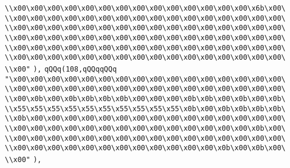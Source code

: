 \verb|\\x00\x00\x00\x00\x00\x00\x00\x00\x00\x00\x00\x00\x00\x00\x6b\x00\|\newline
\verb|\\x00\x00\x00\x00\x00\x00\x00\x00\x00\x00\x00\x00\x00\x00\x00\x00\|\newline
\verb|\\x00\x00\x00\x00\x00\x00\x00\x00\x00\x00\x00\x00\x00\x00\x00\x00\|\newline
\verb|\\x00\x00\x00\x00\x00\x00\x00\x00\x00\x00\x00\x00\x00\x00\x00\x00\|\newline
\verb|\\x00\x00\x00\x00\x00\x00\x00\x00\x00\x00\x00\x00\x00\x00\x00\x00\|\newline
\verb|\\x00\x00\x00\x00\x00\x00\x00\x00\x00\x00\x00\x00\x00\x00\x00\x00\|\newline
\verb|\\x00"|\newline
\verb|),|\newline
\verb|qQQq(108,qQQqqQQq|\newline
\verb|"\x00\x00\x00\x00\x00\x00\x00\x00\x00\x00\x00\x00\x00\x00\x00\x00\|\newline
\verb|\\x00\x00\x00\x00\x00\x00\x00\x00\x00\x00\x00\x00\x00\x00\x00\x00\|\newline
\verb|\\x00\x0b\x00\x0b\x0b\x0b\x0b\x00\x00\x00\x0b\x0b\x00\x0b\x00\x0b\|\newline
\verb|\\x55\x55\x55\x55\x55\x55\x55\x55\x55\x55\x0b\x00\x0b\x0b\x0b\x0b\|\newline
\verb|\\x0b\x00\x00\x00\x00\x00\x00\x00\x00\x00\x00\x00\x00\x00\x00\x00\|\newline
\verb|\\x00\x00\x00\x00\x00\x00\x00\x00\x00\x00\x00\x00\x00\x00\x0b\x00\|\newline
\verb|\\x00\x00\x00\x00\x00\x00\x00\x00\x00\x00\x00\x00\x00\x00\x00\x00\|\newline
\verb|\\x00\x00\x00\x00\x00\x00\x00\x00\x00\x00\x00\x00\x0b\x00\x0b\x00\|\newline
\verb|\\x00"|\newline
\verb|),|\newline
